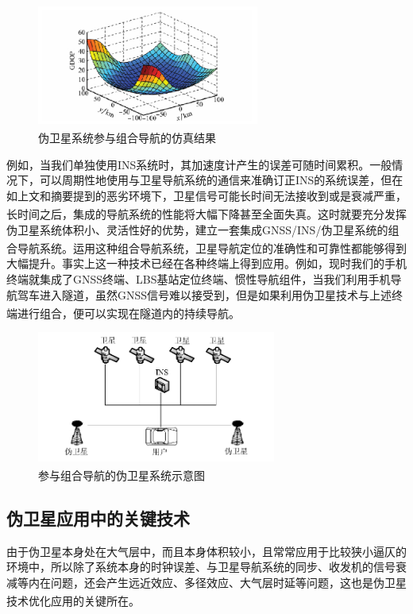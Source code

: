\documentclass[12pt, a4paper, oneside]{ctexart}
\newcommand{\upcite}[1]{\textsuperscript{\cite{#1}}}
\begin{document}
\begin{figure}[ht]
  \centering
  \includegraphics[width=0.65\textwidth]{img/fz.png}
  \caption{伪卫星系统参与组合导航的仿真结果\upcite{03}}
  \label{}
\end{figure}

例如，当我们单独使用INS系统时，其加速度计产生的误差可随时间累积。一般情况下，可以周期性地使用与卫星导航系统的通信来准确订正INS的系统误差，但在如上文和摘要提到的恶劣环境下，卫星信号可能长时间无法接收到或是衰减严重，长时间之后，集成的导航系统的性能将大幅下降甚至全面失真。\upcite{14}这时就要充分发挥伪卫星系统体积小、灵活性好的优势，建立一套集成GNSS/INS/伪卫星系统的组合导航系统。\upcite{002,14}运用这种组合导航系统，卫星导航定位的准确性和可靠性都能够得到大幅提升。事实上这一种技术已经在各种终端上得到应用。例如，现时我们的手机终端就集成了GNSS终端、LBS基站定位终端、惯性导航组件，当我们利用手机导航驾车进入隧道，虽然GNSS信号难以接受到，但是如果利用伪卫星技术与上述终端进行组合，便可以实现在隧道内的持续导航。\upcite{01,14,15}

\begin{figure}[ht]
  \centering
  \includegraphics[width=0.70\textwidth]{img/3.png}
  \caption{参与组合导航的伪卫星系统示意图\upcite{002}}
  \label{}
\end{figure}

\subsection{伪卫星应用中的关键技术}

由于伪卫星本身处在大气层中，而且本身体积较小，且常常应用于比较狭小逼仄的环境中，所以除了系统本身的时钟误差、与卫星导航系统的同步、收发机的信号衰减等内在问题，还会产生远近效应、多径效应、大气层时延等问题，这也是伪卫星技术优化应用的关键所在。\upcite{001,002}
\end{document}
